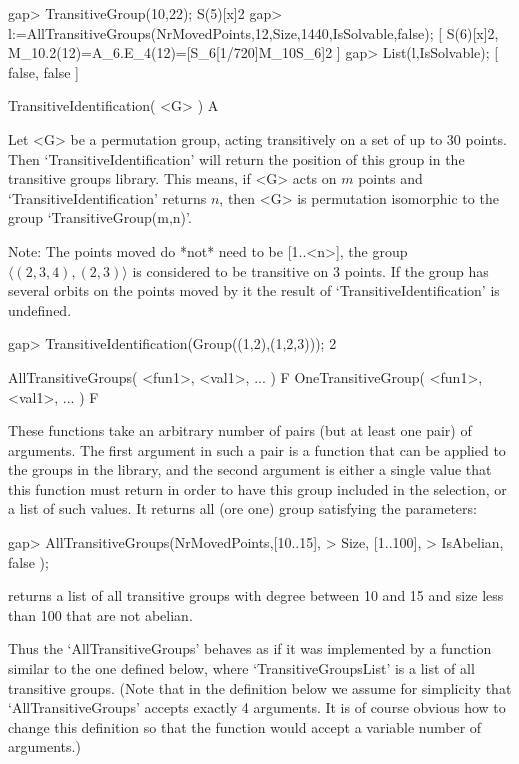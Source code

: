 \beginexample
gap> TransitiveGroup(10,22);
S(5)[x]2
gap> l:=AllTransitiveGroups(NrMovedPoints,12,Size,1440,IsSolvable,false);
[ S(6)[x]2, M_10.2(12)=A_6.E_4(12)=[S_6[1/720]{M_10}S_6]2 ]
gap> List(l,IsSolvable);
[ false, false ]
\endexample

\>TransitiveIdentification( <G> ) A

Let <G> be a permutation group, acting transitively on a set  of up to 30
points.  Then `TransitiveIdentification' will return the position of this
group in the transitive  groups library.  This means,  if <G> acts on
$m$ points and    `TransitiveIdentification'  returns $n$,  then <G>   is
permutation isomorphic to the group `TransitiveGroup(m,n)'.

Note: The points moved do *not* need to be [1..<n>], the group
$\langle (2,3,4),(2,3)\rangle$ is considered to be transitive on 3
points. If the group has several orbits on the points moved by it the
result of `TransitiveIdentification' is undefined.


\beginexample
gap> TransitiveIdentification(Group((1,2),(1,2,3)));
2
\endexample


\>AllTransitiveGroups( <fun1>, <val1>, ... ) F
\>OneTransitiveGroup( <fun1>, <val1>, ... ) F

These functions take an arbitrary number of pairs (but at least one pair)
of arguments. The first argument in such a pair is a function that can be
applied to the groups in the library, and the second argument is either a
single value that this function must return in order to have  this  group
included in the selection, or a list of such  values. 
It returns all (ore one) group satisfying the parameters:

\beginexample
gap> AllTransitiveGroups(NrMovedPoints,[10..15],
>                        Size,         [1..100],
>                        IsAbelian,    false    );
\endexample

returns a list of all transitive groups with degree between 10 and 15 and
size less than 100 that are not abelian.

Thus  the `AllTransitiveGroups'  behaves  as if   it was implemented  by a
function similar to the one defined below, where `TransitiveGroupsList' is a
list of all transitive groups.  (Note that in  the definition below we assume
for simplicity that `AllTransitiveGroups' accepts exactly 4 arguments.  It is
of course  obvious how to change this  definition so that the function would
accept a variable number of arguments.)

